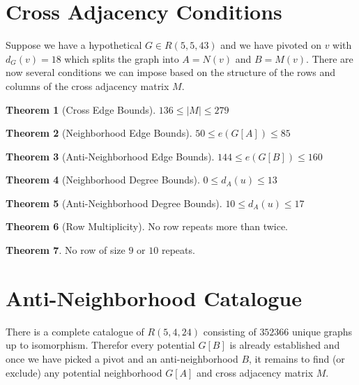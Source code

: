 \documentclass[a4paper]{article}
\theoremstyle{definition}
\newtheorem{theorem}{Theorem}
\begin{document}


\section{Cross Adjacency Conditions}

Suppose we have a hypothetical $G \in R(5, 5, 43)$ and we have pivoted on $v$ with $d_G(v) = 18$ which splits the graph into $A = N(v)$ and $B = M(v)$.
There are now several conditions we can impose based on the structure of the rows and columns of the cross adjacency matrix $M$.

\begin{theorem}[Cross Edge Bounds]
	$136 \leqslant \left| M \right| \leqslant 279$
\end{theorem}

\begin{theorem}[Neighborhood Edge Bounds]
	$50 \leqslant e(G[A]) \leqslant 85$
\end{theorem}

\begin{theorem}[Anti-Neighborhood Edge Bounds]
	$144 \leqslant e(G[B]) \leqslant 160$
\end{theorem}

\begin{theorem}[Neighborhood Degree Bounds]
	$0 \leqslant d_A(u) \leqslant 13$
\end{theorem}

\begin{theorem}[Anti-Neighborhood Degree Bounds]
	$10 \leqslant d_A(u) \leqslant 17$
\end{theorem}

\begin{theorem}[Row Multiplicity]
	No row repeats more than twice.
\end{theorem}

\begin{theorem}
	No row of size $9$ or $10$ repeats.
\end{theorem}

\section{Anti-Neighborhood Catalogue}

There is a complete catalogue of $R(5, 4, 24)$ consisting of $352366$ unique graphs up to isomorphism.
Therefor every potential $G[B]$ is already established and once we have picked a pivot and an anti-neighborhood $B$,
it remains to find (or exclude) any potential neighborhood $G[A]$ and cross adjacency matrix $M$.
\end{document}
